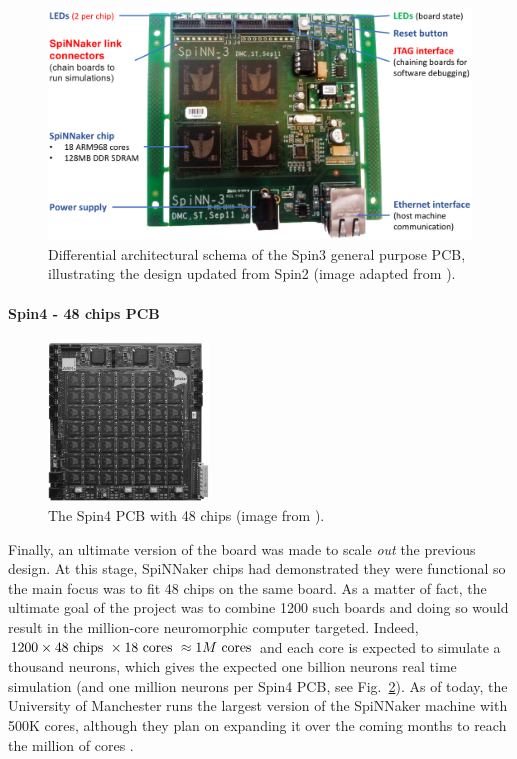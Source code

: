 \begin{figure}[!ht]
\centering
\includegraphics[width=\textwidth]{figures/spin3-schema.png}
\caption{Differential architectural schema of the Spin3 general purpose PCB, illustrating the design updated from Spin2 (image adapted from \cite{dev-process}).}
\label{fig:spin3}
\end{figure} 


\newpage
\paragraph{Spin4 - 48 chips PCB}

\begin{figure}
  \begin{center}
    \includegraphics[width=0.38\textwidth]{figures/spin4.png}
  \end{center}
  \caption{The Spin4 PCB with 48 chips (image from \cite{bic}).}
  \label{fig:spin4}
\end{figure}

Finally, an ultimate version of the board was made to scale \textit{out} the previous design. At this stage, SpiNNaker chips had demonstrated they were functional so the main focus was to fit 48 chips on the same board. As a matter of fact, the ultimate goal of the project was to combine 1200 such boards and doing so would result in the million-core neuromorphic computer targeted. Indeed, $1200 \times 48 \textnormal{ chips } \times  18 \textnormal{ cores } \approx 1M \textnormal{ cores}$ and each core is expected to simulate a thousand neurons, which gives the expected one billion neurons real time simulation (and one million neurons per Spin4 PCB, see Fig.~\ref{fig:spin4}). As of today, the University of Manchester runs the largest version of the SpiNNaker machine with 500K cores, although they plan on expanding it over the coming months to reach the million of cores \cite{act-project-access}. \\ %
 
